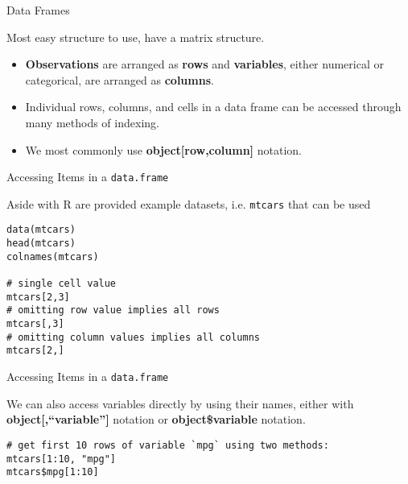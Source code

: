 \begin{frame}{Data Frames}

Most easy structure to use, have a matrix structure.

\begin{itemize}
\item
  \textbf{Observations} are arranged as \textbf{rows} and
  \textbf{variables}, either numerical or categorical, are arranged as
  \textbf{columns}.
\item
  Individual rows, columns, and cells in a data frame can be accessed
  through many methods of indexing.
\item
  We most commonly use \textbf{object{[}row,column{]}} notation.
\end{itemize}

\end{frame}

\begin{frame}[fragile]{Accessing Items in a \texttt{data.frame}}

Aside with R are provided example datasets, i.e. \texttt{mtcars} that
can be used

\begin{verbatim}
data(mtcars)
head(mtcars)
colnames(mtcars)

# single cell value
mtcars[2,3]
# omitting row value implies all rows
mtcars[,3]
# omitting column values implies all columns
mtcars[2,]
\end{verbatim}

\end{frame}

\begin{frame}[fragile]{Accessing Items in a \texttt{data.frame}}

We can also access variables directly by using their names, either with
\textbf{object{[},``variable''{]}} notation or \textbf{object\$variable}
notation.

\begin{verbatim}
# get first 10 rows of variable `mpg` using two methods:
mtcars[1:10, "mpg"]
mtcars$mpg[1:10]
\end{verbatim}

\end{frame}

